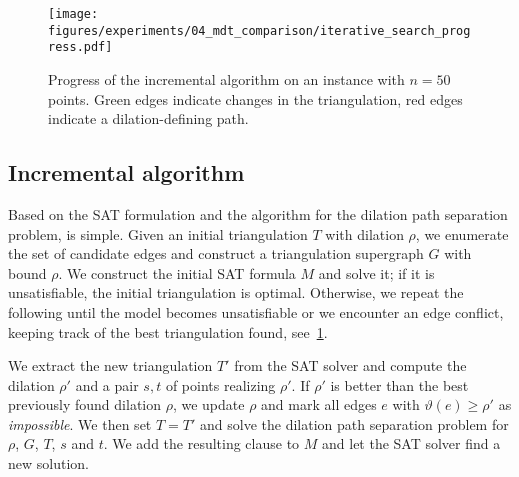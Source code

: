 \begin{figure}
    \texttt{[image: figures/experiments/04\_mdt\_comparison/iterative\_search\_progress.pdf]}
    \caption{Progress of the incremental algorithm on an instance with $n = 50$ points. Green edges indicate changes in the triangulation, red edges indicate a dilation-defining path.}
    \label{fig:iterative-search-progress}
\end{figure}

\subsection{Incremental algorithm}
\label{sec:incremental-algorithm}
Based on the SAT formulation and the algorithm for the dilation path separation problem, \incmdt{} is simple.
Given an initial triangulation $T$ with dilation $\rho$, we enumerate the set of candidate edges and construct a triangulation supergraph $G$ with bound $\rho$.
We construct the initial SAT formula $M$ and solve it; if it is unsatisfiable, the initial triangulation is optimal.
Otherwise, we repeat the following until the model becomes unsatisfiable or we encounter an edge conflict, keeping track of the best triangulation found, see~\cref{fig:iterative-search-progress}.

We extract the new triangulation $T'$ from the SAT solver and compute the dilation $\rho'$ and a pair $s, t$ of points realizing $\rho'$.
If $\rho'$ is better than the best previously found dilation $\rho$, we update $\rho$ and mark all edges $e$ with $\vartheta(e) \geq \rho'$ as \emph{impossible}.
We then set $T = T'$ and solve the dilation path separation problem for $\rho$, $G$, $T$, $s$ and $t$.
We add the resulting clause to $M$ and let the SAT solver find a new solution.
%
%


